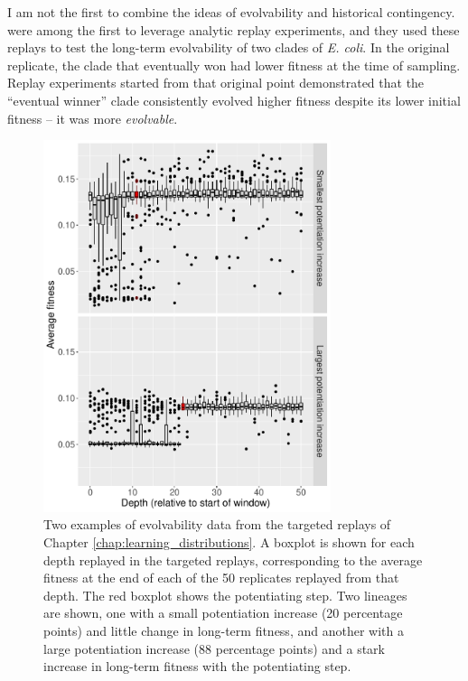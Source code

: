 I am not the first to combine the ideas of evolvability and historical contingency. 
\citet{woodsSecondorderSelectionEvolvability2011} were among the first to leverage analytic replay experiments, and they used these replays to test the long-term evolvability of two clades of \textit{E. coli}.
In the original replicate, the clade that eventually won had lower fitness at the time of sampling. 
Replay experiments started from that original point demonstrated that the ``eventual winner'' clade consistently evolved higher fitness despite its lower initial fitness -- it was more \textit{evolvable}.

\begin{figure}[h!]
\begin{center}
\includegraphics[width=0.75\textwidth]{06_conclusion/media/evolvability.pdf}
\end{center}
\caption{ 
Two examples of evolvability data from the targeted replays of Chapter \ref{chap:learning_distributions}. 
A boxplot is shown for each depth replayed in the targeted replays, corresponding to the average fitness at the end of each of the 50 replicates replayed from that depth. 
The red boxplot shows the potentiating step. 
Two lineages are shown, one with a small potentiation increase (20 percentage points) and little change in long-term fitness, and another with a large potentiation increase (88 percentage points) and a stark increase in long-term fitness with the potentiating step. 
}\label{fig:conclusion_evolvability}
\end{figure}


